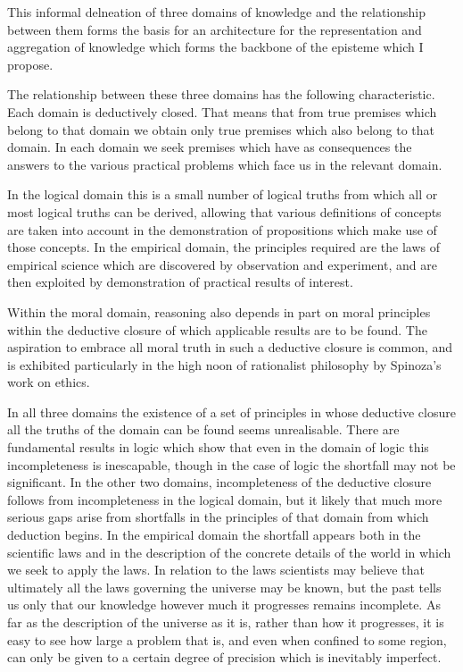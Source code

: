 \documentclass[10pt,titlepage]{article}
\begin{document}
This informal delneation of three domains of knowledge and the relationship between them forms the basis for an architecture for the representation and aggregation of knowledge which forms the backbone of the episteme which I propose.

The relationship between these three domains has the following characteristic.
Each domain is deductively closed.
That means that from true premises which belong to that domain we obtain only true premises which also belong to that domain.
In each domain we seek premises which have as consequences the answers to the various practical problems which face us in the relevant domain.

In the logical domain this is a small number of logical truths from which all or most logical truths can be derived, allowing that various definitions of concepts are taken into account in the demonstration of propositions which make use of those concepts.
In the empirical domain, the principles required are the laws of empirical science which are discovered by observation and experiment, and are then exploited by demonstration of practical results of interest.

Within the moral domain, reasoning also depends in part on moral principles within the deductive closure of which applicable results are to be found.
The aspiration to embrace all moral truth in such a deductive closure is common, and is exhibited particularly in the high noon of rationalist philosophy by Spinoza's work on ethics.

In all three domains the existence of a set of principles in whose deductive closure all the truths of the domain can be found seems unrealisable.
There are fundamental results in logic which show that even in the domain of logic this incompleteness is inescapable, though in the case of logic the shortfall may not be significant.
In the other two domains, incompleteness of the deductive closure follows from incompleteness in the logical domain, but it likely that much more serious gaps arise from shortfalls in the principles of that domain from which deduction begins.
In the empirical domain the shortfall appears both in the scientific laws and in the description of the concrete details of the world in which we seek to apply the laws.
In relation to the laws scientists may believe that ultimately all the laws governing the universe may be known, but the past tells us only that our knowledge however much it progresses remains incomplete.
As far as the description of the universe as it is, rather than how it progresses, it is easy to see how large a problem that is, and even when confined to some region, can only be given to a certain degree of precision which is inevitably imperfect.
\end{document}
